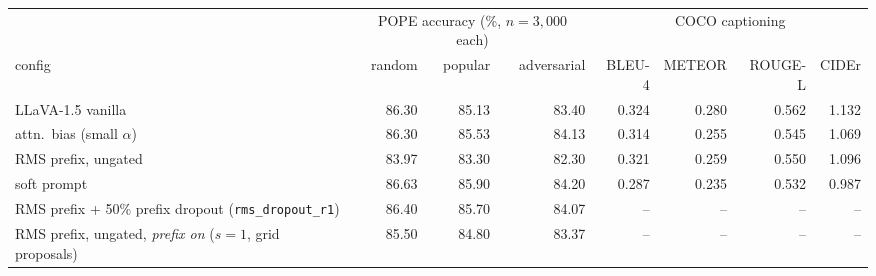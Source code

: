 \begin{tabular}{@{}l rrr rrrr@{}}
\toprule
 & \multicolumn{3}{c}{POPE accuracy (\%, $n{=}3{,}000$ each)} & \multicolumn{4}{c}{COCO captioning} \\
\cmidrule(lr){2-4}\cmidrule(lr){5-8}
config & random & popular & adversarial & BLEU-4 & METEOR & ROUGE-L & CIDEr \\
\midrule
LLaVA-1.5 vanilla & 86.30 & 85.13 & 83.40 & 0.324 & 0.280 & 0.562 & 1.132 \\
attn.\ bias (small $\alpha$) & 86.30 & 85.53 & 84.13 & 0.314 & 0.255 & 0.545 & 1.069 \\
RMS prefix, ungated & 83.97 & 83.30 & 82.30 & 0.321 & 0.259 & 0.550 & 1.096 \\
soft prompt & 86.63 & 85.90 & 84.20 & 0.287 & 0.235 & 0.532 & 0.987 \\
RMS prefix + 50\% prefix dropout (\texttt{rms\_dropout\_r1}) & 86.40 & 85.70 & 84.07 & -- & -- & -- & -- \\
RMS prefix, ungated, \emph{prefix on} ($s{=}1$, grid proposals) & 85.50 & 84.80 & 83.37 & -- & -- & -- & -- \\
\bottomrule
\end{tabular}
